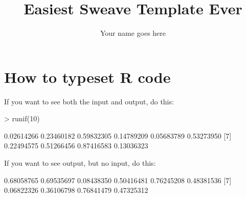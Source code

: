 \documentclass[12pt]{article}         %
\title{Easiest Sweave Template Ever}  %
\author{Your name goes here}          %
\begin{document}



\maketitle              %

\section{How to typeset \textsf{R} code}

If you want to see both the input and output, do this:

\begin{Schunk}
\begin{Sinput}
> runif(10)
\end{Sinput}
\begin{Soutput}
 [1] 0.02614266 0.23460182 0.59832305 0.14789209 0.05683789 0.53273950
 [7] 0.22494575 0.51266456 0.87416583 0.13036323
\end{Soutput}
\end{Schunk}

If you want to see output, but no input, do this:

\begin{Schunk}
\begin{Soutput}
 [1] 0.68058765 0.69535697 0.08438350 0.50416481 0.76245208 0.48381536
 [7] 0.06822326 0.36106798 0.76841479 0.47325312
\end{Soutput}
\end{Schunk}
\end{document}

